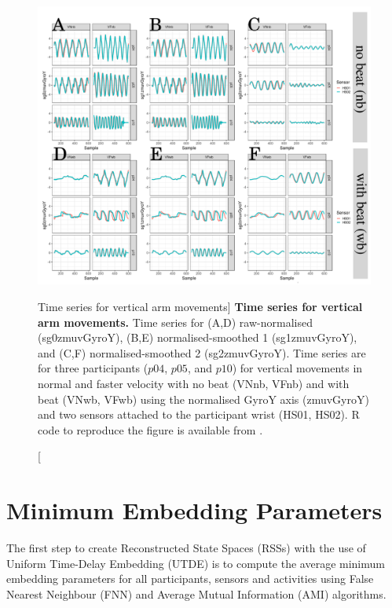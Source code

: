 \begin{figure}
\centering
\includegraphics[width=1.0\textwidth]{tsV}
    	\caption
	[Time series for vertical arm movements]{
	{\bf Time series for vertical arm movements.}
		Time series for (A,D) raw-normalised (sg0zmuvGyroY), 
		(B,E) normalised-smoothed 1 (sg1zmuvGyroY), and
		(C,F) normalised-smoothed 2 (sg2zmuvGyroY).
		Time series are for three participants 
		($p04$, $p05$, and $p10$) 
		for vertical movements in normal and faster velocity with
		no beat	(VNnb, VFnb) and with beat (VNwb, VFwb) using the 
		normalised GyroY axis (zmuvGyroY) and two sensors 
		attached to the participant wrist (HS01, HS02).
	R code to reproduce the figure is available from \cite{hwum2018}.
        }
    \label{fig:tsV-hii}
\end{figure}




\newpage
\section{Minimum Embedding Parameters} \label{mep-hii}
The first step to create Reconstructed State Spaces (RSSs) with the use of
Uniform Time-Delay Embedding (UTDE) is to compute the
average minimum embedding parameters for all participants, sensors and 
activities using False Nearest Neighbour (FNN) and 
Average Mutual Information (AMI) algorithms.

